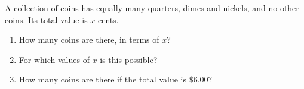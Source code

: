 A collection of coins has equally many quarters, dimes and nickels, and no other coins. Its total value is $x$ cents.
\begin{enumerate}
\item[(a)] How many coins are there, in terms of $x$?
\item[(b)] For which values of $x$ is this possible?
\item[(c)] How many coins are there if the total value is $\$6.00$?
\end{enumerate}
